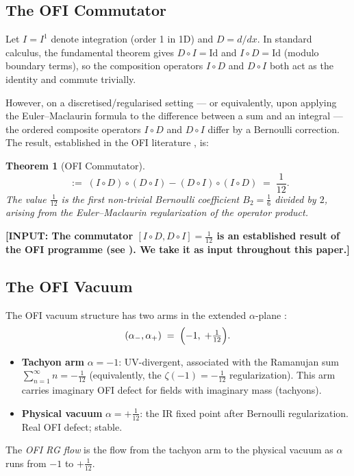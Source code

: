 \documentclass[12pt]{article}
\newtheorem{theorem}{Theorem}[section]
\theoremstyle{definition}
\newcommand{\Id}{\mathrm{Id}}
\newcommand{\INPUT}[1]{\textcolor{inputcolor}{\textbf{[INPUT: #1]}}}
\begin{document}
\subsection{The OFI Commutator}

Let $I = I^1$ denote integration (order 1 in 1D) and $D = d/dx$.
In standard calculus, the fundamental theorem gives $D \circ I = \Id$
and $I \circ D = \Id$ (modulo boundary terms), so the composition
operators $I\circ D$ and $D\circ I$ both act as the identity and commute
trivially.

However, on a discretised/regularised setting — or equivalently, upon
applying the Euler--Maclaurin formula to the difference between a sum and
an integral — the ordered composite operators $I\circ D$ and $D\circ I$
differ by a Bernoulli correction.  The result, established in the OFI
literature \cite{OFI_main,OFI_CC}, is:

\begin{theorem}[OFI Commutator]
\label{thm:commutator}
\begin{equation}
  [I\circ D,\; D\circ I]
  \;:=\;
  (I\circ D)\circ(D\circ I) - (D\circ I)\circ(I\circ D)
  \;=\;
  \frac{1}{12}.
  \label{eq:commutator}
\end{equation}
The value $\tfrac{1}{12}$ is the first non-trivial Bernoulli coefficient
$B_2 = \tfrac{1}{6}$ divided by $2$, arising from the Euler--Maclaurin
regularization of the operator product.
\end{theorem}

\INPUT{The commutator $[I\circ D, D\circ I] = \tfrac{1}{12}$ is an
established result of the OFI programme (see \cite{OFI_main}).  We take
it as input throughout this paper.}

\subsection{The OFI Vacuum}

The OFI vacuum structure has two arms in the extended $\alpha$-plane
\cite{OFI_CC,OFI_NG}:
\begin{equation}
  (\alpha_-, \alpha_+)
  \;=\;
  \Bigl(-1,\; +\tfrac{1}{12}\Bigr).
  \label{eq:vacuum}
\end{equation}
\begin{itemize}[leftmargin=2em]
\item \textbf{Tachyon arm} $\alpha = -1$: UV-divergent, associated with
  the Ramanujan sum $\sum_{n=1}^\infty n = -\tfrac{1}{12}$ (equivalently,
  the $\zeta(-1) = -\tfrac{1}{12}$ regularization).  This arm carries
  imaginary OFI defect for fields with imaginary mass (tachyons).
\item \textbf{Physical vacuum} $\alpha = +\tfrac{1}{12}$: the IR fixed
  point after Bernoulli regularization.  Real OFI defect; stable.
\end{itemize}
The \emph{OFI RG flow} is the flow from the tachyon arm to the physical
vacuum as $\alpha$ runs from $-1$ to $+\tfrac{1}{12}$.
\end{document}
